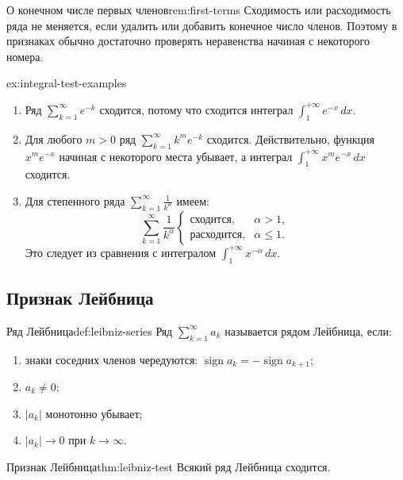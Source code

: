 \begin{Remark}{О конечном числе первых членов}{rem:first-terms}
	Сходимость или расходимость ряда не меняется, если удалить или добавить конечное число членов. Поэтому в признаках обычно достаточно проверять неравенства начиная с некоторого номера.
\end{Remark}

\begin{Example}{}{ex:integral-test-examples}
	\begin{enumerate}
		\item Ряд \(\sum_{k=1}^{\infty} e^{-k}\) сходится, потому что сходится интеграл \(\int_1^{+\infty} e^{-x}\,dx\).
		
		\item Для любого \(m>0\) ряд \(\sum_{k=1}^{\infty} k^m e^{-k}\) сходится. Действительно, функция \(x^m e^{-x}\) начиная с некоторого места убывает, а интеграл \(\int_1^{+\infty} x^m e^{-x}\,dx\) сходится.
		
		\item Для степенного ряда \(\sum_{k=1}^{\infty}\frac1{k^\alpha}\) имеем:
		\[
		\sum_{k=1}^{\infty}\frac1{k^\alpha}
		\begin{cases}
			\text{сходится}, & \alpha>1,\\
			\text{расходится}, & \alpha\le 1.
		\end{cases}
		\]
		Это следует из сравнения с интегралом \(\int_1^{+\infty}x^{-\alpha}\,dx\).
	\end{enumerate}
\end{Example}

\subsection{Признак Лейбница}

\begin{Definition}{Ряд Лейбница}{def:leibniz-series}
	Ряд \(\sum_{k=1}^{\infty}a_k\) называется рядом Лейбница, если:
	\begin{enumerate}
		\item знаки соседних членов чередуются: \(\operatorname{sign}a_k=-\operatorname{sign}a_{k+1}\);
		\item \(a_k\ne 0\);
		\item \(|a_k|\) монотонно убывает;
		\item \(|a_k|\to 0\) при \(k\to\infty\).
	\end{enumerate}
\end{Definition}

\begin{Theorem}{Признак Лейбница}{thm:leibniz-test}
	Всякий ряд Лейбница сходится.
\end{Theorem}

